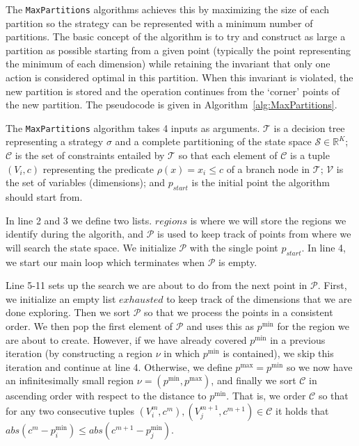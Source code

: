The \texttt{MaxPartitions} algorithms achieves this by maximizing the size of
each partition so the strategy can be represented with a minimum number of
partitions. The basic concept of the algorithm is to try and construct as large
a partition as possible starting from a given point (typically the point
representing the minimum of each dimension) while retaining the invariant that
only one action is considered optimal in this partition. When this invariant is
violated, the new partition is stored and the operation continues from the
`corner' points of the new partition.  The pseudocode is given in
Algorithm~\ref{alg:MaxPartitions}.

The \texttt{MaxPartitions} algorithm takes 4 inputs as arguments. $\mathcal{T}$
is a decision tree representing a strategy $\sigma$ and a complete partitioning
of the state space $\mathcal{S} \in \mathbb{R}^K$; $\mathcal{C}$ is the
set of constraints entailed by $\mathcal{T}$ so that each element of
$\mathcal{C}$ is a tuple $(V_i, c)$ representing the predicate $\rho(x) = x_i
\le c$ of a branch node in $\mathcal{T}$; $\mathcal{V}$ is the set of variables
(dimensions); and $p_{start}$ is the initial point the algorithm should start
from.

In line 2 and 3 we define two lists. $regions$ is where we will store the
regions we identify during the algorith, and $\mathcal{P}$ is used to keep track
of points from where we will search the state space. We initialize
$\mathcal{P}$ with the single point $p_{start}$. In line 4, we start our main
loop which terminates when $\mathcal{P}$ is empty.

Line 5-11 sets up the search we are about to do from the next point in
$\mathcal{P}$. First, we initialize an empty list $exhausted$ to keep track of
the dimensions that we are done exploring. Then we sort $\mathcal{P}$ so that we
process the points in a consistent order. We then pop the first element of
$\mathcal{P}$ and uses this as $p^{\min}$ for the region we are about to create.
However, if we have already covered $p^{\min}$ in a previous iteration (by
constructing a region $\nu$ in which $p^{\min}$ is contained), we skip this
iteration and continue at line 4. Otherwise, we define $p^{\max} = p^{\min}$ so
we now have an infinitesimally small region $\nu = (p^{\min},p^{\max})$, and
finally we sort $\mathcal{C}$ in ascending order with respect to the distance to
$p^{\min}$. That is, we order $\mathcal{C}$ so that for any two consecutive
tuples $(V^m_i, c^m), (V^{m+1}_j, c^{m+1}) \in \mathcal{C}$ it holds that
$abs(c^m - p^{\min}_i) \le  abs(c^{m+1} - p^{\min}_j)$.

